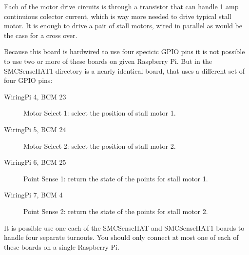 Each of the motor drive circuits is through a transistor that can handle 1 amp 
continuious colector current, which is way more needed to drive typical stall 
motor.  It is enough to drive a pair of stall motors, wired in parallel as 
would be the case for a cross over.

Because this board is hardwired to use four specicic GPIO pins it is not 
possible to use two or more of these boards on given Raspberry Pi.  But in the 
SMCSenseHAT1 directory is a nearly identical board, that uses a different set 
of four GPIO pins:

\begin{description}
\item[WiringPi 4, BCM 23] Motor Select 1: select the position of stall motor 
1. 
\item[WiringPi 5, BCM 24] Motor Select 2: select the position of stall motor 
2. 
\item[WiringPi 6, BCM 25] Point Sense 1: return the state of the points for 
stall motor 1. 
\item[WiringPi 7, BCM 4] Point Sense 2: return the state of the points for 
stall motor 2. 
\end{description}

It is possible use one each of the SMCSenseHAT and SMCSenseHAT1 boards to 
handle four separate turnouts.  You should only connect at most one of each of 
these boards on a single Raspberry Pi.


